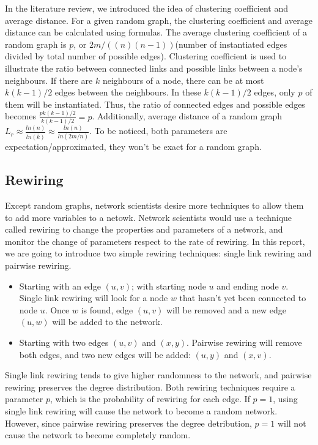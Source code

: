 \documentclass[12pt]{article}
\begin{document}
\noindent
In the literature review, we introduced the idea of clustering coefficient and average distance. For a given random graph, the clustering coefficient and average distance can be calculated using formulas.\cite{barabási2016network} The average clustering coefficient of a random graph is $p$, or $2m/((n)(n-1))$(number of instantiated edges divided by total number of possible edges). Clustering coefficient is used to illustrate the ratio between connected links and possible links between a node's neighbours. If there are $k$ neighbours of a node, there can be at most $k(k-1)/2$ edges between the neighbours. In these $k(k-1)/2$ edges, only $p$ of them will be instantiated. Thus, the ratio of connected edges and possible edges becomes $\frac{pk(k-1)/2}{k(k-1)/2}=p$. Additionally, average distance of a random graph $L_r \approx \frac{ln(n)}{ln\bar{(k)}}\approx \frac{ln(n)}{ln(2m/n)}$. To be noticed, both parameters are expectation/approximated, they won't be exact for a random graph.

\subsection{Rewiring}
\label{rewiring}
Except random graphs, network scientists desire more techniques to allow them to add more variables to a netowk. Network scientists would use a technique called rewiring to change the properties and parameters of a network, and monitor the change of parameters respect to the rate of rewiring.\cite{network_rewiring} In this report, we are going to introduce two simple rewiring techniques: single link rewiring and pairwise rewiring.\\
\begin{itemize}
    \item Starting with an edge $(u,v)$; with starting node $u$ and ending node $v$. Single link rewiring will look for a node $w$ that hasn't yet been connected to node $u$. Once $w$ is found, edge $(u,v)$ will be removed and a new edge $(u,w)$ will be added to the network. 
    \item Starting with two edges $(u,v)$ and $(x,y)$. Pairwise rewiring will remove both edges, and two new edges will be added: $(u,y)$ and $(x,v)$.
\end{itemize}
\noindent
Single link rewiring tends to give higher randomness to the network, and pairwise rewiring preserves the degree distribution. Both rewiring techniques require a parameter $p$, which is the probability of rewiring for each edge. If $p=1$, using single link rewiring will cause the network to become a random network. However, since pairwise rewiring preserves the degree detribution, $p=1$ will not cause the network to become completely random.
\end{document}
